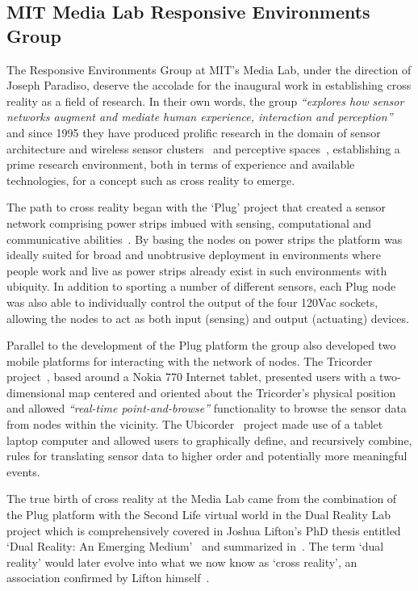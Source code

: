 \subsection{MIT Media Lab Responsive Environments Group}
\label{subsec:responsive_environments_at_mit_media_lab}
The Responsive Environments Group at MIT's Media Lab, under the direction of Joseph Paradiso, deserve the accolade for the inaugural work in establishing cross reality as a field of research. In their own words, the group \textit{``explores how sensor networks augment and mediate human experience, interaction and perception''}~\cite{ResponsiveEnvironmentsGroup} and since 1995 they have produced prolific research in the domain of sensor architecture and wireless sensor clusters~\cite{Paradiso1996, Rowe1999, Burke1996, Paradiso1997, Knaian2000, Teegarden2001, A2007, Ma2002, Bamberg2008, Laibowitz2005, LaPenta2007} and perceptive spaces~\cite{Lifton2001, Paradiso1997a, Paradiso2000, Richardson2004}, establishing a prime research environment, both in terms of experience and available technologies, for a concept such as cross reality to emerge.

The path to cross reality began with the `Plug' project that created a sensor network comprising power strips imbued with sensing, computational and communicative abilities~\cite{Lifton2007b}. By basing the nodes on power strips the platform was ideally suited for broad and unobtrusive deployment in environments where people work and live as power strips already exist in such environments with ubiquity. In addition to sporting a number of different sensors, each Plug node was also able to individually control the output of the four 120Vac sockets, allowing the nodes to act as both input (sensing) and output (actuating) devices.

Parallel to the development of the Plug platform the group also developed two mobile platforms for interacting with the network of nodes. The Tricorder project~\cite{Lifton2007}, based around a Nokia 770 Internet tablet, presented users with a two-dimensional map centered and oriented about the Tricorder's physical position and allowed \textit{``real-time point-and-browse''} functionality to browse the sensor data from nodes within the vicinity. The Ubicorder~\cite{Mittal2011} project made use of a tablet laptop computer and allowed users to graphically define, and recursively combine, rules for translating sensor data to higher order and potentially more meaningful events.

The true birth of cross reality at the Media Lab came from the combination of the Plug platform with the Second Life virtual world in the Dual Reality Lab project which is comprehensively covered in Joshua Lifton's PhD thesis entitled `Dual Reality: An Emerging Medium'~\cite{Lifton2007a} and summarized in~\cite{lifton:merging}. The term `dual reality' would later evolve into what we now know as `cross reality', an association confirmed by Lifton himself~\cite{lifton:adoption}.

